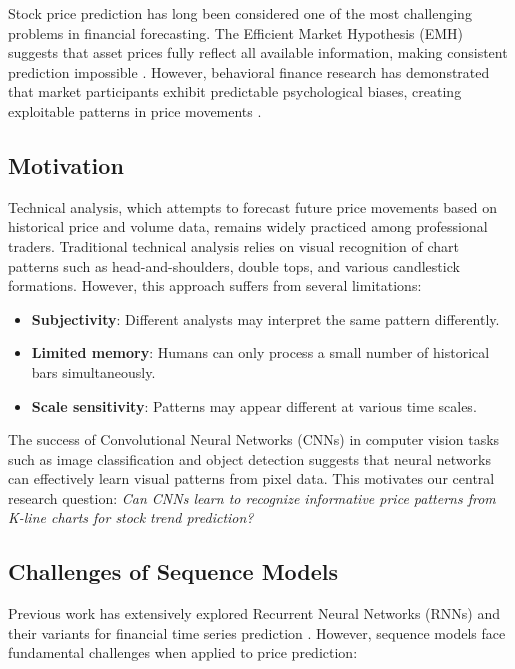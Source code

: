 \documentclass[runningheads]{llncs}
\begin{document}
Stock price prediction has long been considered one of the most challenging problems in financial forecasting. The Efficient Market Hypothesis (EMH) suggests that asset prices fully reflect all available information, making consistent prediction impossible \cite{Fama70}. However, behavioral finance research has demonstrated that market participants exhibit predictable psychological biases, creating exploitable patterns in price movements \cite{Thaler85}.

\subsection{Motivation}
\label{sec:motivation}

Technical analysis, which attempts to forecast future price movements based on historical price and volume data, remains widely practiced among professional traders. Traditional technical analysis relies on visual recognition of chart patterns such as head-and-shoulders, double tops, and various candlestick formations. However, this approach suffers from several limitations:

\begin{itemize}
    \item \textbf{Subjectivity}: Different analysts may interpret the same pattern differently.
    \item \textbf{Limited memory}: Humans can only process a small number of historical bars simultaneously.
    \item \textbf{Scale sensitivity}: Patterns may appear different at various time scales.
\end{itemize}

The success of Convolutional Neural Networks (CNNs) in computer vision tasks such as image classification \cite{Krizhevsky12} and object detection \cite{Ren15} suggests that neural networks can effectively learn visual patterns from pixel data. This motivates our central research question: \textit{Can CNNs learn to recognize informative price patterns from K-line charts for stock trend prediction?}

\subsection{Challenges of Sequence Models}
\label{sec:challenges}

Previous work has extensively explored Recurrent Neural Networks (RNNs) and their variants for financial time series prediction \cite{Fischer18,Bao17}. However, sequence models face fundamental challenges when applied to price prediction:
\end{document}
